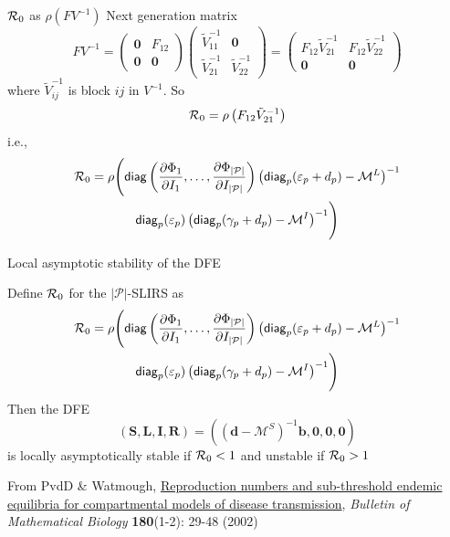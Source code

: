 \documentclass[aspectratio=43]{beamer}
\begin{document}
\begin{frame}{$\mathcal{R}_0$ as $\rho(FV^{-1})$}
Next generation matrix
$$
FV^{-1}=
\begin{pmatrix}
\mathbf{0} & F_{12} \\
\mathbf{0} & \mathbf{0}
\end{pmatrix}
\begin{pmatrix}
\tilde V_{11}^{-1} & \mathbf{0} \\
\tilde V_{21}^{-1} & \tilde V_{22}^{-1}
\end{pmatrix}
=
\begin{pmatrix}
F_{12}\tilde V_{21}^{-1} & F_{12}\tilde V_{22}^{-1} \\
\mathbf{0} & \mathbf{0}
\end{pmatrix}
$$
where $\tilde V_{ij}^{-1}$ is block $ij$ in $V^{-1}$. So
$$
\mathcal{R}_0=\rho\left(F_{12}\tilde{V}_{21}^{-1}\right)
$$
i.e.,
\begin{multline*}
	\mathcal{R}_0=\rho\Biggl(
		\mathsf{diag}\left(
		\frac{\partial\Phi_1}{\partial I_1},\ldots,\frac{\partial\Phi_{|\mathcal{P}|}}{\partial I_{|\mathcal{P}|}}\right)
		\left(\mathsf{diag}_p(\varepsilon_p+d_p)-\mathcal{M}^L\right)^{-1} \\ 
		\mathsf{diag}_p(\varepsilon_p)
		\left(\mathsf{diag}_p(\gamma_p+d_p)-\mathcal{M}^I\right)^{-1}
		\Biggr)			
\end{multline*}
\end{frame}

\begin{frame}{Local asymptotic stability of the DFE}
\begin{theorem}\label{th:LAS_DFE_pSLIRS_toy}
	Define $\mathcal{R}_0$ for the $|\mathcal{P}|$-SLIRS as 
	\begin{multline*}
		\mathcal{R}_0=\rho\Biggl(
			\mathsf{diag}\left(
			\frac{\partial\Phi_1}{\partial I_1},\ldots,\frac{\partial\Phi_{|\mathcal{P}|}}{\partial I_{|\mathcal{P}|}}\right)
			\left(\mathsf{diag}_p(\varepsilon_p+d_p)-\mathcal{M}^L\right)^{-1}  \\
			\mathsf{diag}_p(\varepsilon_p)
			\left(\mathsf{diag}_p(\gamma_p+d_p)-\mathcal{M}^I\right)^{-1}
			\Biggr)				
	\end{multline*}
	Then the DFE
	$$
	(\mathbf{S},\mathbf{L},\mathbf{I},\mathbf{R})=\left((\mathbf{d}-\mathcal{M}^S)^{-1}\mathbf{b},\mathbf{0},\mathbf{0},\mathbf{0}\right)
	$$
	is locally asymptotically stable if $\mathcal{R}_0<1$ and unstable if $\mathcal{R}_0>1$		
\end{theorem}
\vfill
{\tiny
From PvdD \& Watmough, \href{https://doi.org/10.1016/S0025-5564(02)00108-6}{Reproduction numbers and sub-threshold endemic equilibria for compartmental models of disease transmission}, \emph{Bulletin of Mathematical Biology} \textbf{180}(1-2): 29-48 (2002)}
\end{frame}
\end{document}
